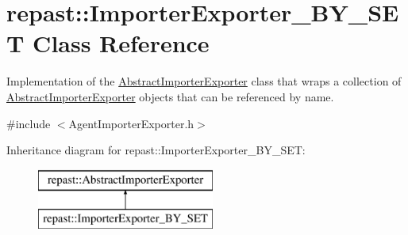 \hypertarget{classrepast_1_1_importer_exporter___b_y___s_e_t}{\section{repast\-:\-:Importer\-Exporter\-\_\-\-B\-Y\-\_\-\-S\-E\-T Class Reference}
\label{classrepast_1_1_importer_exporter___b_y___s_e_t}
}


Implementation of the \hyperlink{classrepast_1_1_abstract_importer_exporter}{Abstract\-Importer\-Exporter} class that wraps a collection of \hyperlink{classrepast_1_1_abstract_importer_exporter}{Abstract\-Importer\-Exporter} objects that can be referenced by name.  




{\ttfamily \#include $<$Agent\-Importer\-Exporter.\-h$>$}

Inheritance diagram for repast\-:\-:Importer\-Exporter\-\_\-\-B\-Y\-\_\-\-S\-E\-T\-:\begin{figure}[H]
\begin{center}
\leavevmode
\includegraphics[height=2.000000cm]{classrepast_1_1_importer_exporter___b_y___s_e_t}
\end{center}
\end{figure}
